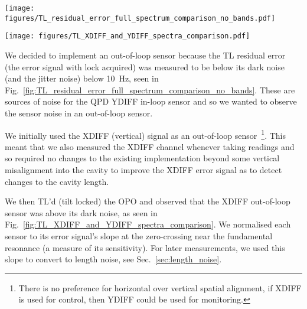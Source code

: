 \documentclass[aps,pra,superscriptaddress,reprint,nofootinbib]{revtex4-1}
\begin{document}
\begin{figure*}
\texttt{[image: figures/TL\_residual\_error\_full\_spectrum\_comparison\_no\_bands.pdf]}
\caption{SR785 measurements from 2020-12-23 of the TL YDIFF residual error (blue) compared against dark noise (orange) and jitter noise (green).}
\label{fig:TL_residual_error_full_spectrum_comparison_no_bands}
\end{figure*}

\begin{figure*}
\texttt{[image: figures/TL\_XDIFF\_and\_YDIFF\_spectra\_comparison.pdf]}
\caption{SR785 measurements from 2021-01-06 comparing the XDIFF and YDIFF residual errors against their dark noises while TL’d against YDIFF. We see that YDIFF goes below dark noise below 10~Hz but that XDIFF remains above dark noise throughout. The residual errors are normalised to the gradient at the zero-crossing in the scanned cavity error signal, i.e.\ normalised to the sensitivity of each sensor, but the dark noise measurements are not normalised.}
\label{fig:TL_XDIFF_and_YDIFF_spectra_comparison}
\end{figure*}

We decided to implement an out-of-loop sensor because the TL residual error (the error signal with lock acquired) was measured to be below its dark noise (and the jitter noise) below 10~Hz, seen in Fig.~\ref{fig:TL_residual_error_full_spectrum_comparison_no_bands}. These are sources of noise for the QPD YDIFF in-loop sensor and so we wanted to observe the sensor noise in an out-of-loop sensor.

We initially used the XDIFF (vertical) signal as an out-of-loop sensor~\footnote{There is no preference for horizontal over vertical spatial alignment, if XDIFF is used for control, then YDIFF could be used for monitoring.}. This meant that we also measured the XDIFF channel whenever taking readings and so required no changes to the existing implementation beyond some vertical misalignment into the cavity to improve the XDIFF error signal as to detect changes to the cavity length.

We then TL’d (tilt locked) the OPO and observed that the XDIFF out-of-loop sensor was above its dark noise, as seen in Fig.~\ref{fig:TL_XDIFF_and_YDIFF_spectra_comparison}. We normalised each sensor to its error signal’s slope at the zero-crossing near the fundamental resonance (a measure of its sensitivity). For later measurements, we used this slope to convert to length noise, see Sec.~\ref{sec:length_noise}.
\end{document}
